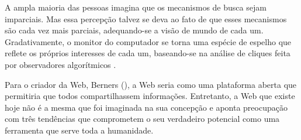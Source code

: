 
A ampla maioria das pessoas imagina que os mecanismos de busca sejam imparciais. Mas essa percepção talvez se deva ao fato de que esses mecanismos são cada vez mais parciais, adequando-se a visão de mundo de cada um. Gradativamente, o monitor do computador se torna uma espécie de espelho que reflete os próprios interesses de cada um, baseando-se na análise de cliques feita por observadores algorítmicos \cite{pariser2012}.

Para o criador da Web, Berners (\citeyear{berners2017}), a Web seria como uma plataforma aberta que permitiria que todos compartilhassem informações.  %
Entretanto, a Web que existe hoje não é a mesma que foi imaginada na sua concepção e aponta preocupação com três tendências que comprometem o seu verdadeiro potencial 
como uma ferramenta que serve toda a humanidade.

